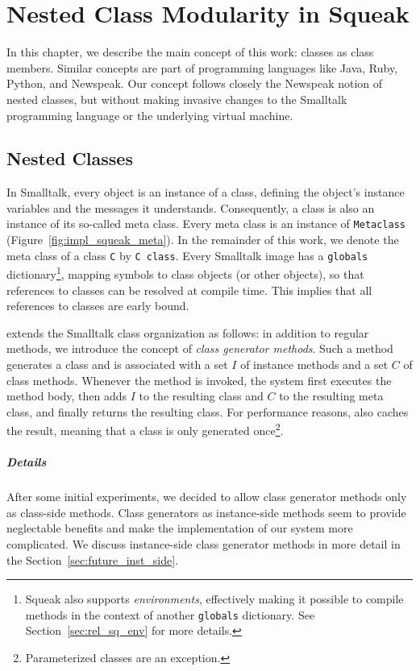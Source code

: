 \chapter{Nested Class Modularity in Squeak}
\label{sec:concept}
In this chapter, we describe the main concept of this work: classes as class members. Similar concepts are part of programming languages like Java, Ruby, Python, and Newspeak. Our concept follows closely the Newspeak notion of nested classes, but without making invasive changes to the Smalltalk programming language or the underlying virtual machine.

\section{Nested Classes}
In Smalltalk, every object is an instance of a class, defining the object's instance variables and the messages it understands. Consequently, a class is also an instance of its so-called meta class. Every meta class is an instance of \texttt{Metaclass} (Figure~\ref{fig:impl_squeak_meta}). In the remainder of this work, we denote the meta class of a class \texttt{C} by \texttt{C class}. Every Smalltalk image has a \texttt{globals} dictionary\footnote{Squeak also supports \emph{environments}, effectively making it possible to compile methods in the context of another \texttt{globals} dictionary. See Section~\ref{sec:rel_sq_env} for more details.}, mapping symbols to class objects (or other objects), so that references to classes can be resolved at compile time. This implies that all references to classes are early bound.

\msname extends the Smalltalk class organization as follows: in addition to regular methods, we introduce the concept of \emph{class generator methods}. Such a method generates a class and is associated with a set $I$ of instance methods and a set $C$ of class methods. Whenever the method is invoked, the system first executes the method body, then adds $I$ to the resulting class and $C$ to the resulting meta class, and finally returns the resulting class. For performance reasons, \msname also caches the result, meaning that a class is only generated once\footnote{Parameterized classes are an exception.}.

\paragraph{Details}
After some initial experiments, we decided to allow class generator methods only as class-side methods. Class generators as instance-side methods seem to provide neglectable benefits and make the implementation of our system more complicated. We discuss instance-side class generator methods in more detail in the Section~\ref{sec:future_inst_side}.

